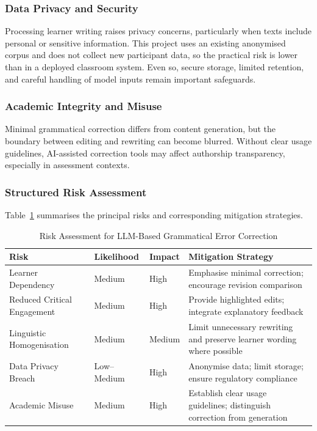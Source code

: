 \subsubsection{Data Privacy and Security}

Processing learner writing raises privacy concerns, particularly when texts include personal or sensitive information. This project uses an existing anonymised corpus and does not collect new participant data, so the practical risk is lower than in a deployed classroom system. Even so, secure storage, limited retention, and careful handling of model inputs remain important safeguards.

\subsubsection{Academic Integrity and Misuse}

Minimal grammatical correction differs from content generation, but the boundary between editing and rewriting can become blurred. Without clear usage guidelines, AI-assisted correction tools may affect authorship transparency, especially in assessment contexts.

\subsubsection*{Structured Risk Assessment}

Table~\ref{tab:risk_assessment} summarises the principal risks and corresponding mitigation strategies.

\begin{table}[htbp]
\centering
\caption{Risk Assessment for LLM-Based Grammatical Error Correction}
\label{tab:risk_assessment}
\begin{tabular}{|p{4cm}|p{3cm}|p{3cm}|p{4cm}|}
\hline
\textbf{Risk} & \textbf{Likelihood} & \textbf{Impact} & \textbf{Mitigation Strategy} \\
\hline
Learner Dependency & Medium & High & Emphasise minimal correction; encourage revision comparison \\
\hline
Reduced Critical Engagement & Medium & High & Provide highlighted edits; integrate explanatory feedback \\
\hline
Linguistic Homogenisation & Medium & Medium & Limit unnecessary rewriting and preserve learner wording where possible \\
\hline
Data Privacy Breach & Low--Medium & High & Anonymise data; limit storage; ensure regulatory compliance \\
\hline
Academic Misuse & Medium & High & Establish clear usage guidelines; distinguish correction from generation \\
\hline
\end{tabular}
\end{table}

